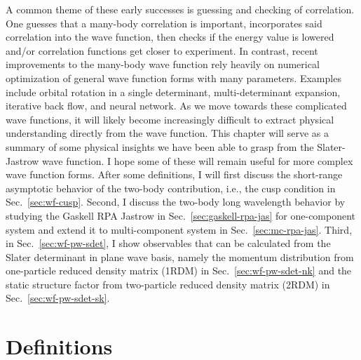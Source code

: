 A common theme of these early successes is guessing and checking of correlation. One guesses that a many-body correlation is important, incorporates said correlation into the wave function, then checks if the energy value is lowered and/or correlation functions get closer to experiment. %
In contrast, recent improvements to the many-body wave function rely heavily on numerical optimization of general wave function forms with many parameters. Examples include orbital rotation in a single determinant, multi-determinant expansion, iterative back flow, and neural network.
As we move towards these complicated wave functions, it will likely become increasingly difficult to extract physical understanding directly from the wave function.
This chapter will serve as a summary of some physical insights we have been able to grasp from the Slater-Jastrow wave function. I hope some of these will remain useful for more complex wave function forms. After some definitions, I will first discuss the short-range asymptotic behavior of the two-body contribution, i.e., the cusp condition in Sec.~\ref{sec:wf-cusp}. Second, I discuss the two-body long wavelength behavior by studying the Gaskell RPA Jastrow in Sec.~\ref{sec:gaskell-rpa-jas} for one-component system and extend it to multi-component system in Sec.~\ref{sec:mc-rpa-jas}. Third, in Sec.~\ref{sec:wf-pw-sdet}, I show observables that can be calculated from the Slater determinant in plane wave basis, namely the momentum distribution from  one-particle reduced density matrix (1RDM) in Sec.~\ref{sec:wf-pw-sdet-nk} and the static structure factor from two-particle reduced density matrix (2RDM) in Sec.~\ref{sec:wf-pw-sdet-sk}.

\section{Definitions}

